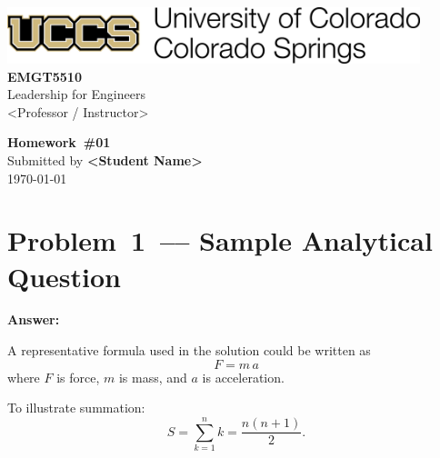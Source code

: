 \documentclass[12pt]{article}
\newenvironment{problem}{\color{dodblue}\itshape}{\par}
\newcommand{\homeworknum}{01}  %
\begin{document}
\begin{center}
    \includegraphics[width=0.9\textwidth,keepaspectratio]{uccs-logo.png}\\[8\baselineskip]

    {\HeadingFont\fontsize{24}{26}\selectfont\textbf{EMGT5510}}\\[0.25\baselineskip]
    {\large Leadership for Engineers}\\[0.15\baselineskip]
    {\small <Professor / Instructor>}\\[2\baselineskip]
\vfill

    {\HeadingFont\fontsize{20}{22}\selectfont\textbf{Homework~\#\homeworknum}}\\[0.5\baselineskip]
    {Submitted by \textbf{<Student Name>}}\\[0.15\baselineskip]
    {\today}
\end{center}

\newpage

\section*{Problem 1 –– Sample Analytical Question}
\begin{problem}
\lipsum[1]
\end{problem}

\textbf{Answer:}\\
\lipsum[2]

A representative formula used in the solution could be written as
\begin{equation}\label{eq:newton}
F = m\,a
\end{equation}
where $F$ is force, $m$ is mass, and $a$ is acceleration.

To illustrate summation:
\begin{equation}
S = \sum_{k=1}^{n} k = \frac{n(n+1)}{2}.
\end{equation}

\end{document}
